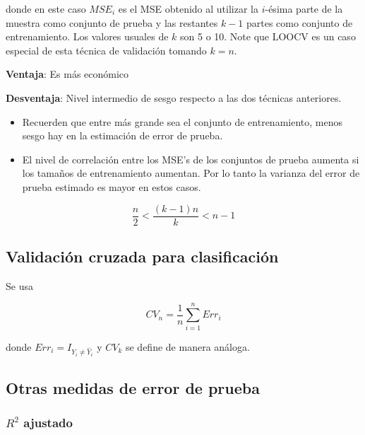 \documentclass[
  12pt,
]{book}
\providecommand{\tightlist}{%
  \setlength{\itemsep}{0pt}\setlength{\parskip}{0pt}}
\begin{document}
donde en este caso \(MSE_i\) es el MSE obtenido al utilizar la
\(i\)-ésima parte de la muestra como conjunto de prueba y las restantes
\(k-1\) partes como conjunto de entrenamiento. Los valores usuales de
\(k\) son 5 o 10. Note que LOOCV es un caso especial de esta técnica de
validación tomando \(k=n\).

\textbf{Ventaja}: Es más económico

\textbf{Desventaja}: Nivel intermedio de sesgo respecto a las dos
técnicas anteriores.

\begin{itemize}
\tightlist
\item
  Recuerden que entre más grande sea el conjunto de entrenamiento, menos
  sesgo hay en la estimación de error de prueba.
\item
  El nivel de correlación entre los MSE's de los conjuntos de prueba
  aumenta si los tamaños de entrenamiento aumentan. Por lo tanto la
  varianza del error de prueba estimado es mayor en estos casos.
\end{itemize}

\begin{equation*}
\frac{n}{2} < \frac{(k-1)n}{k} < n-1
\end{equation*}

\hypertarget{validaciuxf3n-cruzada-para-clasificaciuxf3n}{%
\subsection{Validación cruzada para
clasificación}\label{validaciuxf3n-cruzada-para-clasificaciuxf3n}}

Se usa

\begin{equation*}
CV_{n} = \frac{1}{n} \sum_{i=1}^{n} Err_{i}
\end{equation*}

donde \(Err_i = I_{Y_i \neq \hat{Y}_{i}}\) y \(CV_{k}\) se define de
manera análoga.

\hypertarget{otras-medidas-de-error-de-prueba}{%
\subsection{Otras medidas de error de
prueba}\label{otras-medidas-de-error-de-prueba}}

\hypertarget{r2-ajustado-1}{%
\subsubsection{\texorpdfstring{\(R^2\)
ajustado}{R\^{}2 ajustado}}\label{r2-ajustado-1}}
\end{document}
